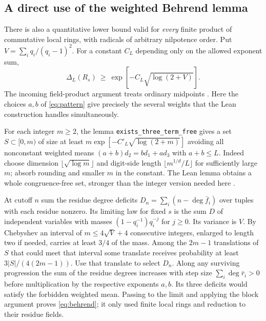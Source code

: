 \subsection{A direct use of the weighted Behrend lemma}
There is also a quantitative lower bound valid for \emph{every} finite product of commutative local rings, with radicals of arbitrary nilpotence order. Put $V=\sum_i q_i/(q_i-1)^2$. For a constant $C_L$ depending only on the allowed exponent sum,
\begin{equation}\label{eq:behrend}
            \Delta_L(R_s)\ \ge\ \exp[-C_L\sqrt{\log(2+V)}] .
\end{equation}
The incoming field-product argument treats ordinary midpoints \cite{products}. Here the choices $a,b$ of \eqref{eq:pattern} give precisely the several weights that the Lean construction handles simultaneously.

For each integer $m\ge2$, the lemma \texttt{exists\_three\_term\_free} gives a set $S\subset[0,m)$ of size at least $m\exp[-C'_L\sqrt{\log(2+m)}]$ avoiding all nonconstant weighted means $(a+b)d_2=b d_1+a d_3$ with $a+b\le L$. Indeed choose dimension $\lfloor\sqrt{\log m}\rfloor$ and digit-side length $\lfloor m^{1/d}/L\rfloor$ for sufficiently large $m$; absorb rounding and smaller $m$ in the constant. The Lean lemma obtains a whole congruence-free set, stronger than the integer version needed here \cite{lean}.

At cutoff $n$ sum the residue degree deficits $D_n=\sum_i(n-\deg\bar f_i)$ over tuples with each residue nonzero. Its limiting law for fixed $s$ is the sum $D$ of independent variables with masses $(1-q_i^{-1})q_i^{-j}$ for $j\ge0$. Its variance is $V$. By Chebyshev an interval of $m\le4\sqrt V+4$ consecutive integers, enlarged to length two if needed, carries at least $3/4$ of the mass. Among the $2m-1$ translations of $S$ that could meet that interval some translate receives probability at least $3|S|/(4(2m-1))$. Use that translate to select $D_n$. Along any surviving progression the sum of the residue degrees increases with step size $\sum_i\deg\bar r_i>0$ before multiplication by the respective exponents $a,b$. Its three deficits would satisfy the forbidden weighted mean. Passing to the limit and applying the block argument proves \eqref{eq:behrend}; it only used finite local rings and reduction to their residue fields.
